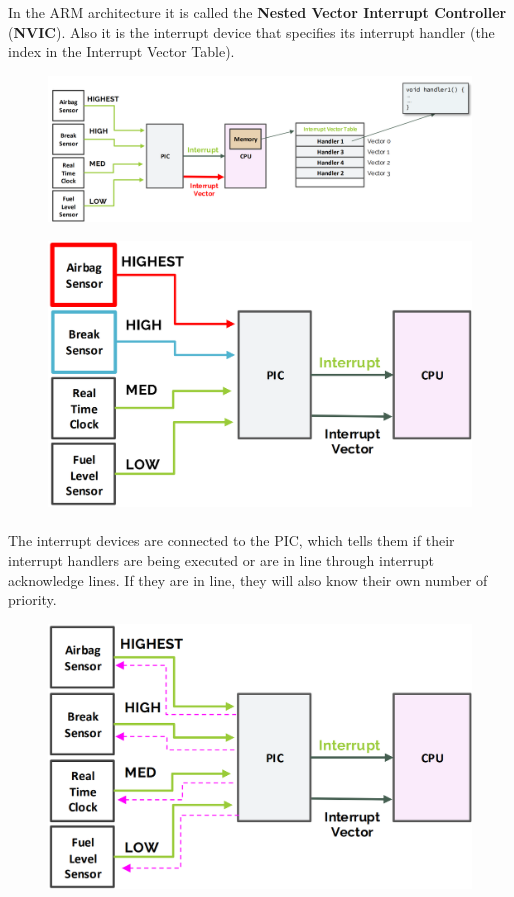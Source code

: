 In the ARM architecture it is called the \textbf{Nested Vector Interrupt Controller} (\textbf{NVIC}). Also it is the interrupt device that specifies its interrupt handler (the index in the Interrupt Vector Table).

\begin{figure}[H]
    \centering
    \includegraphics[width=1\linewidth]{img/image44.png}
\end{figure}

\begin{figure}[H]
    \centering
    \includegraphics[width=0.65\linewidth]{img/image47.png}
\end{figure}


\paragraph{}
The interrupt devices are connected to the PIC, which tells them if their interrupt handlers are being
executed or are in line through interrupt acknowledge lines. If they are in line, they will also know their
own number of priority.

\begin{figure}[H]
    \centering
    \includegraphics[width=0.65\linewidth]{img/image48.png}
\end{figure}


